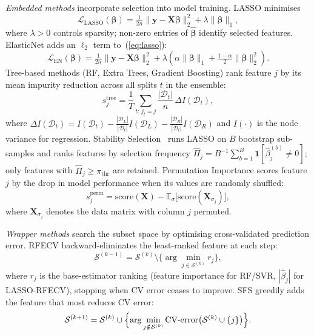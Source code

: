 \documentclass[conference]{IEEEtran}
\begin{document}
\emph{Embedded methods} incorporate selection into model training.
LASSO minimises
\begin{equation}
    \mathcal{L}_{\mathrm{LASSO}}(\boldsymbol{\beta})
    = \tfrac{1}{2n}\|\mathbf{y} - \mathbf{X}\boldsymbol{\beta}\|_2^2
    + \lambda\|\boldsymbol{\beta}\|_1,
    \label{eq:lasso}
\end{equation}
where $\lambda > 0$ controls sparsity; non-zero entries of $\hat{\boldsymbol{\beta}}$
identify selected features.
ElasticNet adds an $\ell_2$ term to~(\ref{eq:lasso}):
\begin{equation}
    \mathcal{L}_{\mathrm{EN}}(\boldsymbol{\beta})
    = \tfrac{1}{2n}\|\mathbf{y} - \mathbf{X}\boldsymbol{\beta}\|_2^2
    + \lambda\!\left(\alpha\|\boldsymbol{\beta}\|_1
      + \tfrac{1-\alpha}{2}\|\boldsymbol{\beta}\|_2^2\right).
    \label{eq:elasticnet}
\end{equation}
Tree-based methods (RF, Extra Trees, Gradient Boosting) rank feature $j$ by its
mean impurity reduction across all splits $t$ in the ensemble:
\begin{equation}
    s_j^{\mathrm{tree}} = \frac{1}{T}\sum_{t:\,j_t=j}
        \frac{|\mathcal{D}_t|}{n}\,\Delta I(\mathcal{D}_t),
    \label{eq:impurity}
\end{equation}
where $\Delta I(\mathcal{D}_t)=I(\mathcal{D}_t)
  -\tfrac{|\mathcal{D}_L|}{|\mathcal{D}_t|}I(\mathcal{D}_L)
  -\tfrac{|\mathcal{D}_R|}{|\mathcal{D}_t|}I(\mathcal{D}_R)$
and $I(\cdot)$ is the node variance for regression.
Stability Selection~\cite{Meinshausen2009} runs LASSO on $B$ bootstrap sub-samples
and ranks features by selection frequency
$\hat{\Pi}_j = B^{-1}\sum_{b=1}^{B}\mathbf{1}[\hat{\beta}_j^{(b)}\neq 0]$;
only features with $\hat{\Pi}_j \geq \pi_{\mathrm{thr}}$ are retained.
Permutation Importance scores feature $j$ by the drop in model performance
when its values are randomly shuffled:
\begin{equation}
    s_j^{\mathrm{perm}} = \mathrm{score}(\mathbf{X})
        - \mathbb{E}_{\sigma}\bigl[\mathrm{score}(\mathbf{X}_{\sigma_j})\bigr],
    \label{eq:permutation}
\end{equation}
where $\mathbf{X}_{\sigma_j}$ denotes the data matrix with column $j$ permuted.

\emph{Wrapper methods} search the subset space by optimising cross-validated
prediction error.
RFECV backward-eliminates the least-ranked feature at each step:
\begin{equation}
    \mathcal{S}^{(k-1)} = \mathcal{S}^{(k)}
        \setminus \bigl\{\arg\min_{j\in\mathcal{S}^{(k)}} r_j\bigr\},
    \label{eq:rfecv}
\end{equation}
where $r_j$ is the base-estimator ranking (feature importance for RF/SVR,
$|\hat{\beta}_j|$ for LASSO-RFECV), stopping when CV error ceases to improve.
SFS greedily adds the feature that most reduces CV error:
\begin{equation}
    \mathcal{S}^{(k+1)} = \mathcal{S}^{(k)} \cup
        \Bigl\{\arg\min_{j\notin\mathcal{S}^{(k)}}
            \mathrm{CV\text{-}error}\bigl(\mathcal{S}^{(k)}\cup\{j\}\bigr)\Bigr\}.
    \label{eq:sfs}
\end{equation}
\end{document}
